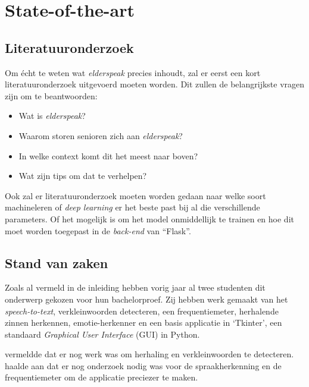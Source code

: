 
\section{State-of-the-art}
\label{sec:state-of-the-art}

\subsection{Literatuuronderzoek}\label{subsec:literatuuronderzoek}

Om écht te weten wat \textit{elderspeak} precies inhoudt, zal er eerst een kort literatuuronderzoek uitgevoerd moeten worden.
Dit zullen de belangrijkste vragen zijn om te beantwoorden:
\begin{itemize}
	\item Wat is \textit{elderspeak}?
	\item Waarom storen senioren zich aan \textit{elderspeak}?
	\item In welke context komt dit het meest naar boven?
	\item Wat zijn tips om dat te verhelpen?
\end{itemize}

Ook zal er literatuuronderzoek moeten worden gedaan naar welke soort machineleren of \textit{deep learning} er het beste past bij al die verschillende parameters.
Of het mogelijk is om het model onmiddellijk te trainen en hoe dit moet worden toegepast in de \textit{back-end} van ``Flask''.

\subsection{Stand van zaken}\label{subsec:stand-van-zaken}

Zoals al vermeld in de inleiding hebben vorig jaar al twee studenten dit onderwerp gekozen voor hun bachelorproef.
Zij hebben werk gemaakt van het \textit{speech-to-text}, verkleinwoorden detecteren, een frequentiemeter, herhalende zinnen herkennen, emotie-herkenner en een basis applicatie in `Tkinter', een standaard \textit{Graphical User Interface} (GUI) in Python.

\textcite{Beeckman2021} vermeldde dat er nog werk was om herhaling en verkleinwoorden te detecteren. \textcite{Standaert2021} haalde aan dat er nog onderzoek nodig was voor de spraakherkenning en de frequentiemeter om de applicatie preciezer te maken.

